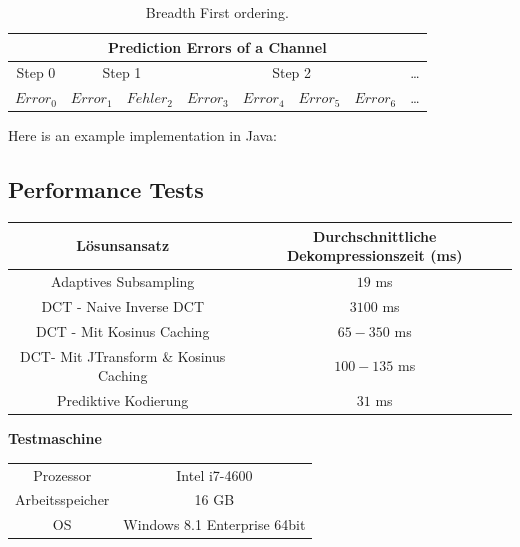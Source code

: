 \begin{table}[!htbp]
	\center
	\begin{tabular}{|c||c|c||c|c|c|c||c}
		\hline
		\multicolumn{8}{|c|}{Prediction Errors of a Channel}\\\hline\hline
		 Step 0& \multicolumn{2}{|c||}{Step 1} & \multicolumn{4}{|c||}{Step 2} &\ldots \\\hline
		$Error_0$ & $Error_1$ &$Fehler_2$ &$Error_3$ & $Error_4$ & $Error_5$ & $Error_6$   & \ldots \\\hline
	\end{tabular}
	\caption{Breadth First ordering.}
	\label{anhang:prediction:breath}
\end{table}
\pagebreak
Here is an example implementation in Java:

\pagebreak

\subsection{Performance Tests} \label{anhang:performance}
\begin{table}[!htbp]
\center
\begin{tabular}{c|c}
	Lösunsansatz & Durchschnittliche Dekompressionszeit (ms) \\\hline
	Adaptives Subsampling & $19$ ms \\
	DCT - Naive Inverse DCT & $3100$ ms \\
	DCT - Mit Kosinus Caching & $65-350$ ms\\
	DCT- Mit JTransform \& Kosinus Caching & $100-135$ ms\\
	Prediktive Kodierung & $31$ ms\\
\end{tabular}
\end{table}

\textbf{Testmaschine}
\begin{table}[!htbp]

\begin{tabular}{c|c}
	Prozessor & Intel i7-4600 \\
	Arbeitsspeicher & 16 GB \\
	OS & Windows 8.1 Enterprise 64bit \\
\end{tabular}
\end{table}
